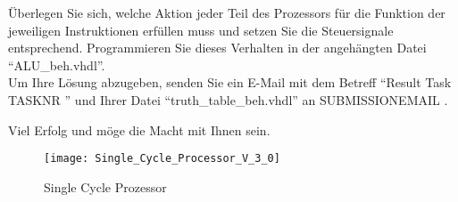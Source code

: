 \documentclass[a4paper,12pt]{article}
\begin{document}
\"Uberlegen Sie sich, welche Aktion jeder Teil des Prozessors f\"ur die Funktion der jeweiligen Instruktionen erf\"ullen muss und setzen Sie die Steuersignale entsprechend. Programmieren Sie dieses Verhalten in der angeh\"angten Datei "`ALU\_beh.vhdl"'.\\

Um Ihre L\"osung abzugeben, senden Sie ein E-Mail mit dem Betreff "`Result Task {{ TASKNR }}"' und Ihrer Datei "`truth\_table\_beh.vhdl"'  an {{ SUBMISSIONEMAIL }}.

\vspace{0.7cm}

Viel Erfolg und m\"oge die Macht mit Ihnen sein.

\begin{landscape}
\begin{figure}[!h]
\vspace{-0.5cm}
\hspace{-1.8cm}
\texttt{[image: Single\_Cycle\_Processor\_V\_3\_0]}
\caption{Single Cycle Prozessor}
\label{fig:SingleCycleProcessor}
\end{figure}
\end{landscape}
\end{document}
